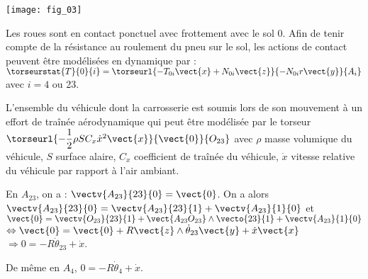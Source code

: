 \begin{marginfigure}
\texttt{[image: fig\_03]}
\end{marginfigure}

Les roues sont en contact ponctuel avec frottement avec le sol 0. Afin de tenir compte de la résistance au roulement du pneu sur le sol, les actions de contact peuvent être modélisées en dynamique par : 
$\torseurstat{T}{0}{i}=\torseurl{-T_{0i}\vect{x}+N_{0i}\vect{z}}{-N_{0i}r\vect{y}}{A_i}$ avec $i=4$ ou 23.

L’ensemble du véhicule dont la carrosserie est soumis lors de son mouvement à un effort de traînée aérodynamique qui peut être modélisée par le torseur 
$\torseurl{-\dfrac{1}{2}\rho S C_x \dot{x}^2 \vect{x}}{\vect{0}}{O_{23}}$ avec $\rho$ masse volumique du véhicule, $S$ surface alaire, $C_x$ coefficient de traînée du véhicule, $\dot{x}$ vitesse relative du véhicule par rapport à l'air ambiant. 


\fi

\ifprof
\begin{corrige}
En $A_{23}$, on a : $\vectv{A_{23}}{23}{0}=\vect{0}$. On a alors $\vectv{A_{23}}{23}{0}=\vectv{A_{23}}{23}{1}+\vectv{A_{23}}{1}{0}$ et $\vect{0}=\vectv{O_{23}}{23}{1}+\vect{A_{23}O_{23}}\wedge \vecto{23}{1}+\vectv{A_{23}}{1}{0} $ $\Leftrightarrow \vect{0}=\vect{0}+R\vect{z}\wedge \dot{\theta}_{23}\vect{y} + \dot{x}\vect{x}$ $\Rightarrow 0=-R \dot{\theta}_{23} + \dot{x}$.

De même en $A_4$, $0=-R \dot{\theta}_{4} + \dot{x}$.
\end{corrige}
\else
\fi

